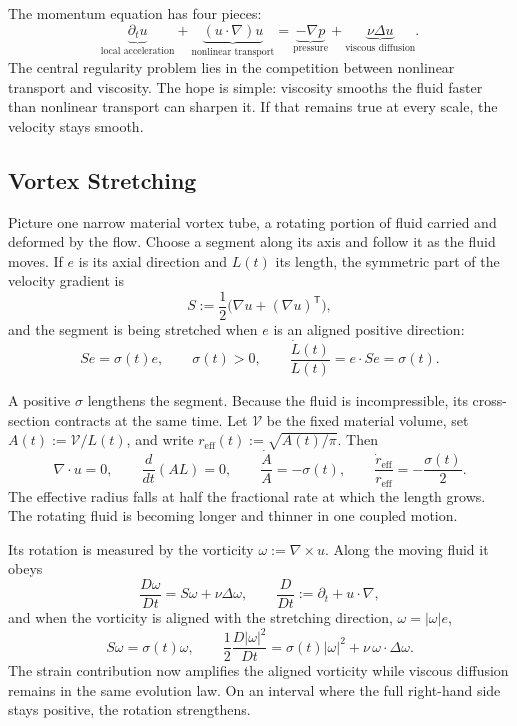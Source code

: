 
The momentum equation has four pieces:
\[
  \underbrace{\partial_t u}_{\text{local acceleration}}
  +
  \underbrace{(u\cdot\nabla)u}_{\text{nonlinear transport}}
  =
  \underbrace{-\nabla p}_{\text{pressure}}
  +
  \underbrace{\nu\Delta u}_{\text{viscous diffusion}}.
\]
The central regularity problem lies in the competition between nonlinear transport and viscosity.
The hope is simple: viscosity smooths the fluid faster than nonlinear transport can sharpen it.
If that remains true at every scale, the velocity stays smooth.

\subsection{Vortex Stretching}\label{sub:ThePerfectlyStretchingVortex}

Picture one narrow material vortex tube, a rotating portion of fluid carried and deformed by the flow.
Choose a segment along its axis and follow it as the fluid moves.
If \(e\) is its axial direction and \(L(t)\) its length, the symmetric part of the velocity gradient is
\[
  S:=\frac12\bigl(\nabla u+(\nabla u)^{\mathsf T}\bigr),
\]
and the segment is being stretched when \(e\) is an aligned positive direction:
\[
  Se=\sigma(t)e,
  \qquad
  \sigma(t)>0,
  \qquad
  \frac{\dot L(t)}{L(t)}
  =
  e\cdot Se
  =
  \sigma(t).
\]

A positive \(\sigma\) lengthens the segment.
Because the fluid is incompressible, its cross-section contracts at the same time.
Let \(\mathcal V\) be the fixed material volume, set \(A(t):=\mathcal V/L(t)\), and write \(r_{\mathrm{eff}}(t):=\sqrt{A(t)/\pi}\).
Then
\[
  \nabla\cdot u=0,
  \qquad
  \frac{d}{dt}(A L)=0,
  \qquad
  \frac{\dot A}{A}=-\sigma(t),
  \qquad
  \frac{\dot r_{\mathrm{eff}}}{r_{\mathrm{eff}}}
  =
  -\frac{\sigma(t)}{2}.
\]
The effective radius falls at half the fractional rate at which the length grows.
The rotating fluid is becoming longer and thinner in one coupled motion.

Its rotation is measured by the vorticity \(\omega:=\nabla\times u\).
Along the moving fluid it obeys
\[
  \frac{D\omega}{Dt}
  =
  S\omega+\nu\Delta\omega,
  \qquad
  \frac{D}{Dt}
  :=
  \partial_t+u\cdot\nabla,
\]
and when the vorticity is aligned with the stretching direction, \(\omega=|\omega|e\),
\[
  S\omega
  =
  \sigma(t)\omega,
  \qquad
  \frac12\frac{D|\omega|^2}{Dt}
  =
  \sigma(t)|\omega|^2
  +
  \nu\,\omega\cdot\Delta\omega.
\]
The strain contribution now amplifies the aligned vorticity while viscous diffusion remains in the same evolution law.
On an interval where the full right-hand side stays positive, the rotation strengthens.

